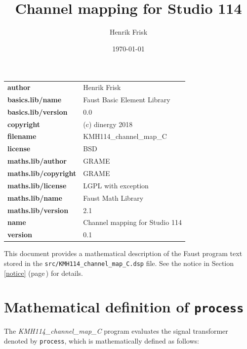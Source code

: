 \documentclass{article}
\newcommand{\faustfilename}{src/KMH114\_channel\_map\_C.dsp}
\newcommand{\faustprogname}{KMH114\_channel\_map\_C}
\begin{document}
\title{Channel mapping for Studio 114} \author{ Henrik Frisk } \date{\today} \maketitle \begin{tabular}{ll}  \hline  \textbf{author} &  Henrik Frisk  \\  \textbf{basics.lib/name} & Faust Basic Element Library \\  \textbf{basics.lib/version} & 0.0 \\  \textbf{copyright} & (c) dinergy 2018  \\  \textbf{filename} & KMH114\_channel\_map\_C \\  \textbf{license} &  BSD  \\  \textbf{maths.lib/author} & GRAME \\  \textbf{maths.lib/copyright} & GRAME \\  \textbf{maths.lib/license} & LGPL with exception \\  \textbf{maths.lib/name} & Faust Math Library \\  \textbf{maths.lib/version} & 2.1 \\  \textbf{name} & Channel mapping for Studio 114 \\  \textbf{version} &  0.1  \\  \hline \end{tabular} \bigskip  \bigskip This document provides a mathematical description of the Faust program text stored in the \texttt{\faustfilename} file. See the notice in Section\,\ref{notice} (page\,\pageref{notice}) for details.   \section{Mathematical definition of \texttt{process}} \label{equation}  The \emph{\faustprogname} program evaluates the signal transformer denoted by \texttt{process}, which is mathematically defined as follows: 
\end{document}
